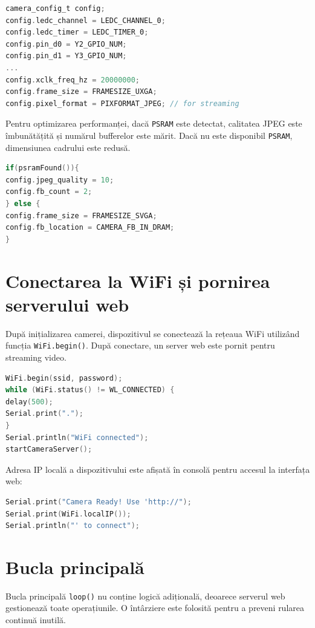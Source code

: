 \documentclass[a4paper,12pt]{report}
\begin{document}
\begin{lstlisting}[language=C, caption=Inițializarea configurației camerei]
camera_config_t config;
config.ledc_channel = LEDC_CHANNEL_0;
config.ledc_timer = LEDC_TIMER_0;
config.pin_d0 = Y2_GPIO_NUM;
config.pin_d1 = Y3_GPIO_NUM;
...
config.xclk_freq_hz = 20000000;
config.frame_size = FRAMESIZE_UXGA;
config.pixel_format = PIXFORMAT_JPEG; // for streaming
\end{lstlisting}

Pentru optimizarea performanței, dacă \texttt{PSRAM} este detectat, calitatea JPEG este îmbunătățită și numărul bufferelor este mărit. Dacă nu este disponibil \texttt{PSRAM}, dimensiunea cadrului este redusă.

\begin{lstlisting}[language=C, caption=Optimizare pentru PSRAM]
if(psramFound()){
config.jpeg_quality = 10;
config.fb_count = 2;
} else {
config.frame_size = FRAMESIZE_SVGA;
config.fb_location = CAMERA_FB_IN_DRAM;
}
\end{lstlisting}

\section{Conectarea la WiFi și pornirea serverului web}
După inițializarea camerei, dispozitivul se conectează la rețeaua WiFi utilizând funcția \texttt{WiFi.begin()}. După conectare, un server web este pornit pentru streaming video.

\begin{lstlisting}[language=C, caption=Conectarea la WiFi și inițializarea serverului]
WiFi.begin(ssid, password);
while (WiFi.status() != WL_CONNECTED) {
delay(500);
Serial.print(".");
}
Serial.println("WiFi connected");
startCameraServer();
\end{lstlisting}

Adresa IP locală a dispozitivului este afișată în consolă pentru accesul la interfața web:

\begin{lstlisting}[language=C, caption=Afișarea adresei IP]
Serial.print("Camera Ready! Use 'http://");
Serial.print(WiFi.localIP());
Serial.println("' to connect");
\end{lstlisting}

\section{Bucla principală}
Bucla principală \texttt{loop()} nu conține logică adițională, deoarece serverul web gestionează toate operațiunile. O întârziere este folosită pentru a preveni rularea continuă inutilă.
\end{document}
